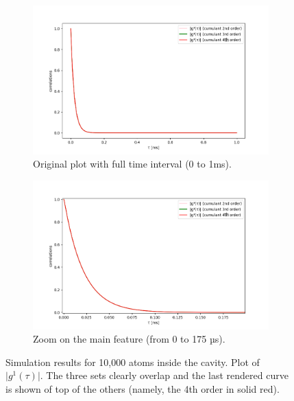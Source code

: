 \documentclass[11pt]{report}
\begin{document}
\begin{figure}[h!]
\centering
\begin{subfigure}{.48\textwidth}
  \centering
  \includegraphics[width=1\linewidth]{10k_234_g1}
  \caption{Original plot with full time interval (0 to 1ms).}
\end{subfigure}%
\hspace{1em}%
\begin{subfigure}{.48\textwidth}
  \centering
  \includegraphics[width=1\linewidth]{10k_234_g1_zoom}
  \caption{Zoom on the main feature (from 0 to 175 µs).}
  \label{10k_234_g1_zoom}
\end{subfigure}
\caption{Simulation results for 10,000 atoms inside the cavity. Plot of $\vert g^1(\tau) \vert$. The three sets clearly overlap and the last rendered curve is shown of top of the others (namely, the 4th order in solid red).}
\end{figure}
\end{document}
